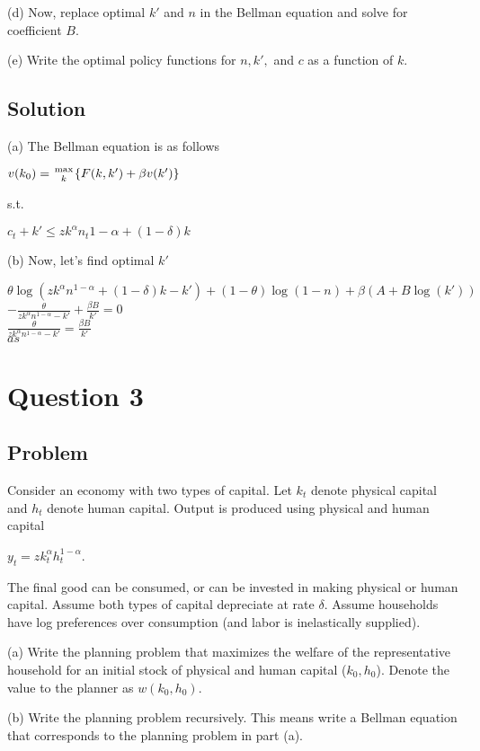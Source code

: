 \documentclass[10pt, a4paper]{article}
\begin{document}
    (d) Now, replace optimal $k'$ and $n$ in the Bellman equation and solve for coefficient $B$.

    (e) Write the optimal policy functions for $n,k',$ and $c$ as a function of $k$.
  \subsection*{Solution}
    (a) The Bellman equation is as follows
    \begin{center}
      $v(k_0) = {\max\atop{k}}\{F(k,k')+\beta v(k')\}$
    \end{center}
    s.t.
    \begin{center}
      $c_t+k'\leq zk^{\alpha}n_t{1-\alpha}+(1-\delta)k$
    \end{center}
    (b) Now, let's find optimal $k'$
    \begin{center}
      $\theta\log(zk^{\alpha}n^{1-\alpha}+(1-\delta)k-k')+(1-\theta)\log(1-n)+\beta(A+B\log(k'))$ \\
      $-\frac{\theta}{zk^{\alpha}n^{1-\alpha}-k'}+\frac{\beta B}{k'}=0$ \\
      $\frac{\theta}{zk^{\alpha}n^{1-\alpha}-k'}=\frac{\beta B}{k'}$ \\
      $as$
    \end{center}
\section*{Question 3}
  \subsection*{Problem}
    Consider an economy with two types of capital. Let $k_t$ denote physical capital and $h_t$ denote human capital. Output is produced using physical and human capital
    \begin{center}
      $y_t=zk_t^{\alpha}h_t^{1-\alpha}$.
    \end{center}
    The final good can be consumed, or can be invested in making physical or human capital. Assume both types of capital depreciate at rate $\delta$. Assume households have log preferences over consumption (and labor is inelastically supplied).

    (a) Write the planning problem that maximizes the welfare of the representative household for an initial stock of physical and human capital ($k_0,h_0$). Denote the value to the planner as $w(k_0,h_0)$.

    (b) Write the planning problem recursively. This means write a Bellman equation that corresponds to the planning problem in part (a).
\end{document}

